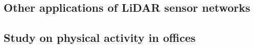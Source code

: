 \subsection{Other applications of LiDAR sensor networks}


\subsection{Study on physical activity in offices}

